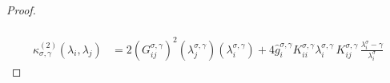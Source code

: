 \documentclass[11pt]{article}
\begin{document}
\begin{proof}
\begin{align}
\end{align}

\begin{align} \label{eq:kappa2}
 \kappa^{(2)}_{\sigma, \gamma}(\lambda_i, \lambda_j)  &= 2  (G^{\sigma, \gamma}_{ij})^2 (\lambda^{\sigma, \gamma}_j) \left(\lambda^{\sigma, \gamma}_i\right) +  4 \hat g^{\sigma, \gamma}_i K^{\sigma, \gamma}_{ii} \lambda^{\sigma, \gamma}_{i} \, K^{\sigma, \gamma}_{ij} \,\frac{\lambda^\sigma_i - \gamma}{\lambda^\sigma_i } %

\end{align}
\end{proof}
\end{document}
